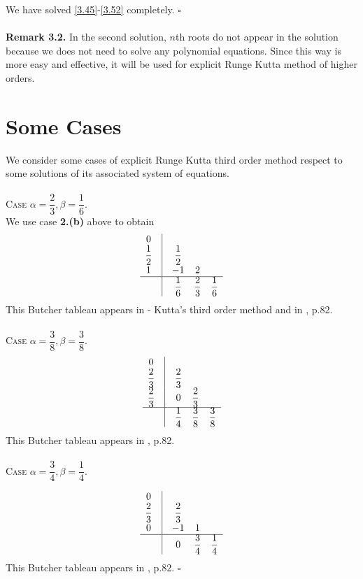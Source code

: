 \documentclass[a4paper,oneside]{book}
\numberwithin{equation}{chapter}
\begin{document}
We have solved \eqref{3.45}-\eqref{3.52} completely. \hfill $\square$\\
\\
\textbf{Remark 3.2.} In the second solution, $n$th roots do not appear in the solution because we does not need to solve any polynomial equations. Since this way is more easy and effective, it will be used for explicit Runge Kutta method of higher orders.
\section{Some Cases}
We consider some cases of explicit Runge Kutta third order method respect to some solutions of its associated system of equations.\\
\\
\textsc{Case $\alpha  = \dfrac{2}{3},\beta  = \dfrac{1}{6}$.}\\
We use case \textbf{2.(b)} above to obtain
\begin{align}
\begin{array}{*{20}{c}}
0&\vline& {}&{}&{}\\
{\dfrac{1}{2}}&\vline& {\dfrac{1}{2}}&{}&{}\\
1&\vline& { - 1}&2&{}\\
\hline
{}&\vline& {\dfrac{1}{6}}&{\dfrac{2}{3}}&{\dfrac{1}{6}}
\end{array}
\end{align}
This Butcher tableau appears in \cite{3} - Kutta's third order method and in \cite{butcher}, p.82.\\
\\
\textsc{Case $\alpha  = \dfrac{3}{8},\beta  = \dfrac{3}{8}$.}
\begin{align}
\begin{array}{*{20}{c}}
0&\vline& {}&{}&{}\\
{\dfrac{2}{3}}&\vline& {\dfrac{2}{3}}&{}&{}\\
{\dfrac{2}{3}}&\vline& 0&{\dfrac{2}{3}}&{}\\
\hline
{}&\vline& {\dfrac{1}{4}}&{\dfrac{3}{8}}&{\dfrac{3}{8}}
\end{array}
\end{align}
This Butcher tableau appears in \cite{butcher}, p.82.\\
\\
\textsc{Case $\alpha  = \dfrac{3}{4},\beta  = \dfrac{1}{4}$.}

\begin{align}
\begin{array}{*{20}{c}}
0&\vline& {}&{}&{}\\
{\dfrac{2}{3}}&\vline& {\dfrac{2}{3}}&{}&{}\\
0&\vline& { - 1}&1&{}\\
\hline
{}&\vline& 0&{\dfrac{3}{4}}&{\dfrac{1}{4}}
\end{array}
\end{align}
This Butcher tableau appears in \cite{butcher}, p.82.  \hfill $\square$
\end{document}
